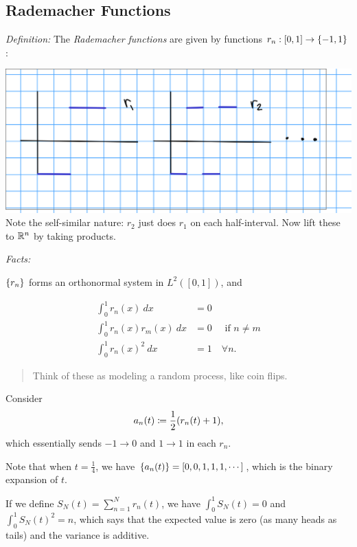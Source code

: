 \hypertarget{rademacher-functions}{%
\subsection{Rademacher Functions}\label{rademacher-functions}}

\emph{Definition:} The \emph{Rademacher functions} are given by
functions \(r_n: [0, 1] \to \left\{{-1, 1}\right\}\):

\includegraphics{figures/2019-12-03-11:11.png}\\

Note the self-similar nature: \(r_2\) just does \(r_1\) on each
half-interval. Now lift these to \({\mathbb{R}}^n\) by taking products.

\emph{Facts:}

\(\left\{{r_n}\right\}\) forms an orthonormal system in \(L^2([0, 1])\), and

\begin{align*}
\int_0^1 r_n(x) ~dx &= 0 \\
\int_0^1 r_n(x) r_m(x) ~dx &= 0 \quad \text{ if } n\neq m \\
\int_0^1 r_n(x)^2 ~dx &= 1 \quad \forall n
.\end{align*}

\begin{quote}
Think of these as modeling a random process, like coin flips.
\end{quote}

Consider
\begin{align*}
a_n(t) \coloneqq \frac{1}{2}(r_n(t) + 1)
,\end{align*} which essentially sends \(-1 \to 0\) and \(1\to 1\) in
each \(r_n\).

Note that when \(t = \frac 1 4\), we have
\(\left\{{a_n(t)}\right\} = [0, 0, 1, 1, 1, \cdots]\), which is the binary
expansion of \(t\).

If we define \(S_N(t) = \sum_{n=1}^N r_n(t)\), we have
\(\int_0^1 S_N(t) = 0\) and \(\int_0^1 S_N(t)^2 = n\), which says that
the expected value is zero (as many heads as tails) and the variance is
additive.

